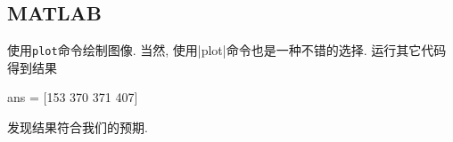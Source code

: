 \documentclass[a4paper, 12pt]{ctexart}
\let\oldlstinputlisting
\renewcommand{}[2][\empty]{
    \par\nolinenumbers\oldlstinputlisting[#1]{#2}\linenumbers\par
}
\let\oldlstlisting\lstlisting
\let\oldendlstlisting\endlstlisting
\renewenvironment{lstlisting}
    {\par\nolinenumbers\oldlstlisting}
    {\oldendlstlisting\endnolinenumbers\par}
\theoremstyle{plain}
\theoremstyle{plain}
\theoremstyle{plain}
\theoremstyle{nonumberplain}
\begin{document}
    \subsection{MATLAB}

    
    使用\lstinline[style=MATLAB-editor, basicstyle=\mlttfamily]{plot}命令绘制图像.
    当然, 使用|plot|命令也是一种不错的选择.
    运行其它代码得到结果
    \begin{lstlisting}[
        title=标题,
        style=MATLAB-editor,
        basicstyle=\mlttfamily\scriptsize,
        numberstyle={\color{black!33}\scriptsize\sffamily}
    ]
        ans = [153 370 371 407]
    \end{lstlisting}
    发现结果符合我们的预期.


    \newpage
    
    
\end{document}
